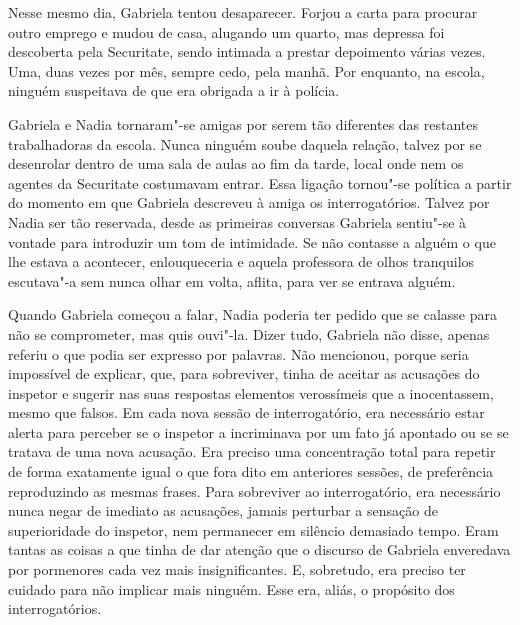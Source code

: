 Nesse mesmo dia, Gabriela tentou desaparecer. Forjou a carta para
procurar outro emprego e mudou de casa, alugando um quarto, mas depressa
foi descoberta pela Securitate, sendo intimada a prestar depoimento
várias vezes. Uma, duas vezes por mês, sempre cedo, pela manhã. Por
enquanto, na escola, ninguém suspeitava de que era obrigada a ir à
polícia.

Gabriela e Nadia tornaram"-se amigas por serem tão diferentes das
restantes trabalhadoras da escola. Nunca ninguém soube daquela relação,
talvez por se desenrolar dentro de uma sala de aulas ao fim da tarde,
local onde nem os agentes da Securitate costumavam entrar. Essa ligação
tornou"-se política a partir do momento em que Gabriela descreveu à amiga
os interrogatórios. Talvez por Nadia ser tão reservada, desde as
primeiras conversas Gabriela sentiu"-se à vontade para introduzir um tom de intimidade. Se não contasse a
alguém o que lhe estava a acontecer, enlouqueceria e aquela professora
de olhos tranquilos escutava"-a sem nunca olhar em volta, aflita, para
ver se entrava alguém.

Quando Gabriela começou a falar, Nadia poderia ter pedido que se calasse
para não se comprometer, mas quis ouvi"-la. Dizer tudo, Gabriela não
disse, apenas referiu o que
podia ser expresso por palavras. Não mencionou, porque seria impossível
de explicar, que, para sobreviver, tinha de aceitar as acusações do
inspetor e sugerir nas suas respostas elementos verossímeis que a
inocentassem, mesmo que falsos. Em cada nova sessão de interrogatório,
era necessário estar alerta para perceber se o inspetor a incriminava
por um fato já apontado ou se se tratava de uma nova acusação. Era
preciso uma concentração total para repetir de forma exatamente igual o
que fora dito em anteriores sessões, de preferência reproduzindo as
mesmas frases. Para sobreviver ao interrogatório, era necessário nunca
negar de imediato as acusações, jamais perturbar a sensação de
superioridade do inspetor, nem permanecer em silêncio demasiado tempo.
Eram tantas as coisas a que tinha de dar atenção que o discurso de
Gabriela enveredava por pormenores cada vez mais insignificantes. E,
sobretudo, era preciso ter cuidado para não implicar mais ninguém.
Esse era, aliás, o propósito dos interrogatórios.

